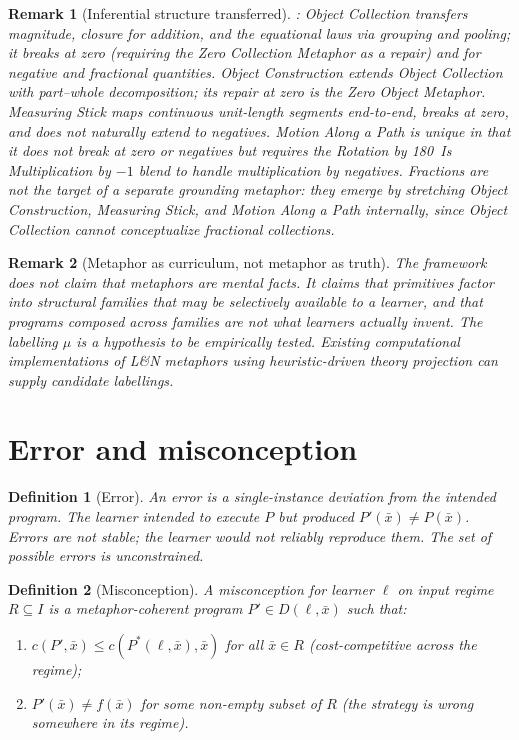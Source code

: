 \documentclass[11pt]{article}
\newtheorem{definition}{Definition}
\newtheorem{remark}{Remark}
\begin{document}
\begin{remark}[Inferential structure transferred]
\parencite{lakoffNunez2000}: Object Collection transfers magnitude,
closure for addition, and the equational laws via grouping and
pooling; it breaks at zero (requiring the \emph{Zero Collection
Metaphor} as a repair) and for negative and fractional quantities.
Object Construction extends Object Collection with part--whole
decomposition; its repair at zero is the \emph{Zero Object Metaphor}.
Measuring Stick maps continuous unit-length segments end-to-end,
breaks at zero, and does not naturally extend to negatives. Motion
Along a Path is unique in that it does \emph{not} break at zero or
negatives but requires the \emph{Rotation by 180\textdegree\ Is
Multiplication by $-1$} blend to handle multiplication by negatives.
Fractions are not the target of a separate grounding metaphor: they
emerge by stretching Object Construction, Measuring Stick, and Motion
Along a Path internally, since Object Collection cannot conceptualize
fractional collections.
\end{remark}

\begin{remark}[Metaphor as curriculum, not metaphor as truth]
The framework does not claim that metaphors are mental facts. It
claims that primitives factor into structural families that may be
selectively available to a learner, and that programs composed across
families are not what learners actually invent. The labelling $\mu$ is
a hypothesis to be empirically tested. Existing computational
implementations of L\&N metaphors using heuristic-driven theory
projection \parencite{guhe2011blending, guhe2009commutativity} can
supply candidate labellings.
\end{remark}

\section{Error and misconception}
\label{sec:error}

\begin{definition}[Error]
An \emph{error} is a single-instance deviation from the intended
program. The learner intended to execute $P$ but produced
$P'(\bar{x}) \ne P(\bar{x})$. Errors are not stable; the learner would
not reliably reproduce them. The set of possible errors is
unconstrained.
\end{definition}

\begin{definition}[Misconception]
A \emph{misconception} for learner $\ell$ on input regime $R \subseteq
I$ is a metaphor-coherent program $P' \in D(\ell, \bar{x})$ such that:
\begin{enumerate}[noitemsep,topsep=2pt,label=(M\arabic*)]
  \item $c(P', \bar{x}) \le c(P^*(\ell, \bar{x}), \bar{x})$ for all
        $\bar{x} \in R$ (cost-competitive across the regime);
  \item $P'(\bar{x}) \ne f(\bar{x})$ for some non-empty subset of $R$
        (the strategy is wrong somewhere in its regime).
\end{enumerate}
\end{definition}
\end{document}
